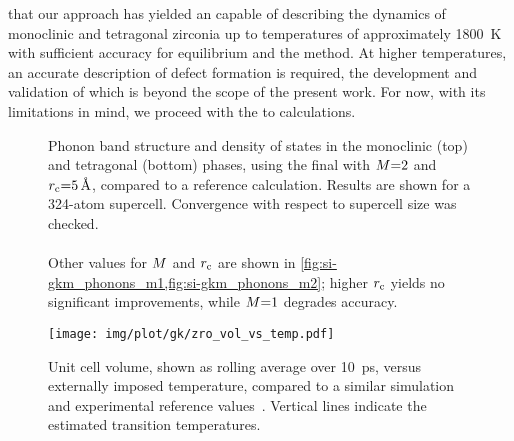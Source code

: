  that our approach has yielded an \mlp capable of describing the dynamics of monoclinic and tetragonal zirconia up to temperatures of approximately \qty{1800}{K} with sufficient accuracy for equilibrium \md and the \gk method.
At higher temperatures, an accurate description of defect formation is required, the development and validation of which is beyond the scope of the present work.
For now, with its limitations in mind, we proceed with the \schnet \mlp to \gk calculations.

\begin{figure}
  \centering


  \caption{
  Phonon band structure and density of states in the monoclinic (top) and tetragonal (bottom) phases, using the final \schnet \mlp with $M{=}2$ and $r_{\text{c}}{=}\qty{5}{\angstrom}$, compared to a \aims reference calculation.
  Results are shown for a 324-atom supercell. Convergence with respect to supercell size was checked.
  \\\\
  Other values for $M$ and $r_{\text{c}}$ are shown in \cref{fig:si-gkm_phonons_m1,fig:si-gkm_phonons_m2}; higher $r_{\text{c}}$ yields no significant improvements, while $M{=}1$ degrades accuracy.
  }
  \label{fig:gkm_phonons}
\end{figure}


\begin{figure}
  \texttt{[image: img/plot/gk/zro\_vol\_vs\_temp.pdf]}
  \caption{
  Unit cell volume, shown as rolling average over \qty{10}{ps}, versus externally imposed temperature, compared to a similar \mlp{} simulation~\cite{vkjk2021q} and experimental reference values~\cite{kh1998t}.
  Vertical lines indicate the estimated transition temperatures.
  }
  \label{fig:gkm_vol_vs_temp}
\end{figure}

